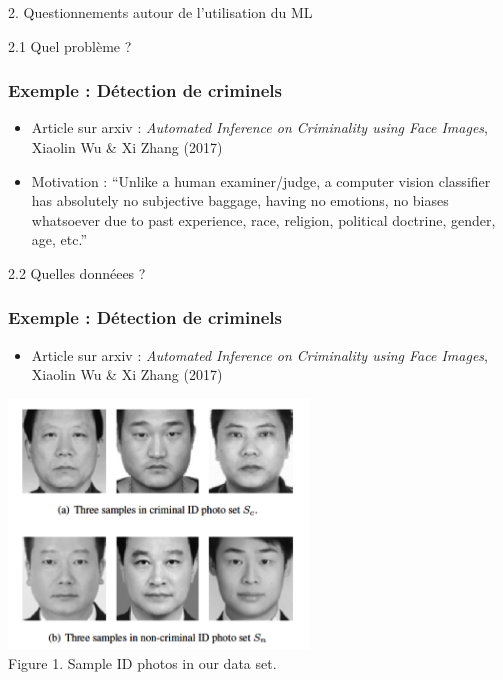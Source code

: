 \documentclass[sans,14pt]{beamer}
\begin{document}
{\begin{frame}
  \begin{center}
    \Large 2. Questionnements autour de l'utilisation du ML
  \end{center}
\end{frame}


\begin{frame}
  \begin{center}
    \Large 2.1 Quel problème ?
  \end{center}
\end{frame}

\begin{frame}[t]
  \frametitle{Exemple : Détection de criminels}
  \begin{itemize}
  \item Article sur arxiv : \textit{Automated Inference on Criminality using
      Face Images}, Xiaolin Wu \& Xi Zhang (2017)
  \item Motivation : \textcolor{MyBlue}{``Unlike a human examiner/judge, a
      computer vision classifier has absolutely no subjective baggage, having
      no emotions, no biases whatsoever due to past experience, race, religion,
      political doctrine, gender, age, etc.''}
  \end{itemize}
\end{frame}


\begin{frame}
  \begin{center}
    \Large 2.2 Quelles donnéees ?
  \end{center}
\end{frame}

\begin{frame}[t]
  \frametitle{Exemple : Détection de criminels}
  \begin{itemize}
  \item Article sur arxiv : \textit{Automated Inference on Criminality using
      Face Images}, Xiaolin Wu \& Xi Zhang (2017)
  \end{itemize}
  \begin{center}
    \includegraphics[width=0.6\textwidth]{figures/criminals_wu_zhang_2016} \\
    \footnotesize Figure 1. Sample ID photos in our data set.
  \end{center}
\end{frame}


}
\end{document}
